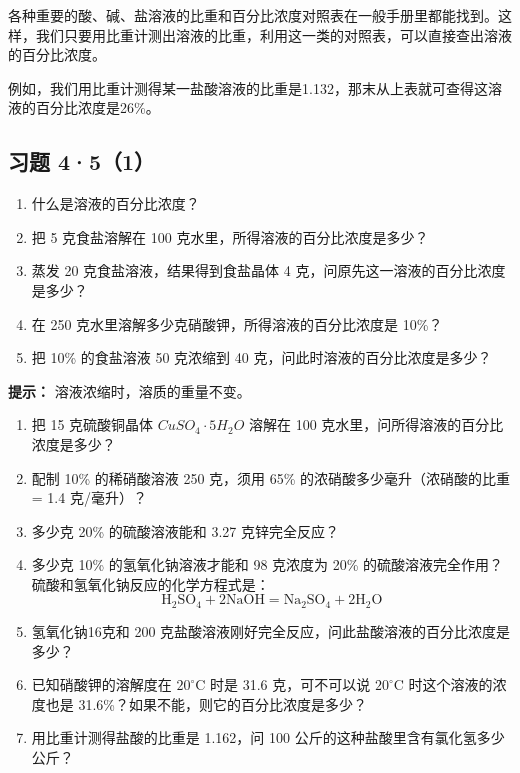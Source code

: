 各种重要的酸、碱、盐溶液的比重和百分比浓度对照表在一般手册里都能找到。这样，我们只要用比重计测出溶液的比重，利用这一类的对照表，可以直接查出溶液的百分比浓度。

例如，我们用比重计测得某一盐酸溶液的比重是1.132，那末从上表就可查得这溶液的百分比浓度是26\%。

\subsection{习题 4·5（1）}

\begin{enumerate}
\item
  什么是溶液的百分比浓度？
\item
  把 5 克食盐溶解在 100 克水里，所得溶液的百分比浓度是多少？
\item
  蒸发 20 克食盐溶液，结果得到食盐晶体 4
  克，问原先这一溶液的百分比浓度是多少？
\item
  在 250 克水里溶解多少克硝酸钾，所得溶液的百分比浓度是 10\%？
\item
  把 10\% 的食盐溶液 50 克浓缩到 40 克，问此时溶液的百分比浓度是多少？
\end{enumerate}

\begin{shulihuadef}
\textbf{提示：} 溶液浓缩时，溶质的重量不变。
\end{shulihuadef}

\begin{enumerate}[start=6]
\item
  把 15 克硫酸铜晶体 \(CuSO_{4} \cdot 5H_{2}O\) 溶解在 100
  克水里，问所得溶液的百分比浓度是多少？
\item
  配制 10\% 的稀硝酸溶液 250 克，须用 65\%
  的浓硝酸多少毫升（浓硝酸的比重 = 1.4 克/毫升）？
\item
  多少克 20\% 的硫酸溶液能和 3.27 克锌完全反应？
\item
  多少克 10\% 的氢氧化钠溶液才能和 98 克浓度为 20\%
  的硫酸溶液完全作用？硫酸和氢氧化钠反应的化学方程式是：
\[
\mathrm{H}_{2} \mathrm{SO}_{4} + 2 \mathrm{NaOH} = \mathrm{Na}_{2} \mathrm{SO}_{4} + 2 \mathrm{H}_{2} \mathrm{O}
\]
\item
  氢氧化钠16克和 200
  克盐酸溶液刚好完全反应，问此盐酸溶液的百分比浓度是多少？
\item
  已知硝酸钾的溶解度在 \(20^{\circ} \mathrm{C}\) 时是 31.6
  克，可不可以说 \(20^{\circ} \mathrm{C}\) 时这个溶液的浓度也是
  31.6\%？如果不能，则它的百分比浓度是多少？
\item
  用比重计测得盐酸的比重是 1.162，问 100
  公斤的这种盐酸里含有氯化氢多少公斤？
\end{enumerate}


